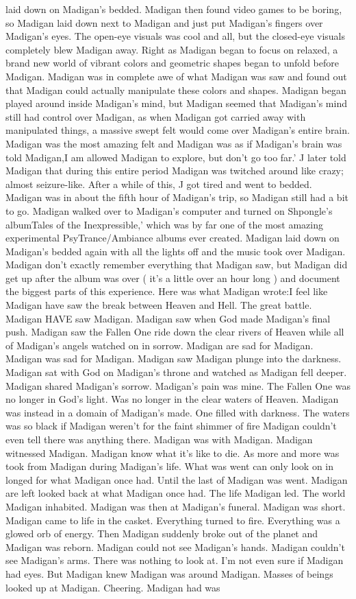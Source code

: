 \documentclass[12pt]{book}
\begin{document}
laid down on Madigan's bedded. Madigan then found video games to be boring, so Madigan laid down next to Madigan and just put Madigan's fingers over Madigan's eyes. The open-eye visuals was cool and all, but the closed-eye visuals completely blew Madigan away. Right as Madigan began to focus on relaxed, a brand new world of vibrant colors and geometric shapes began to unfold before Madigan. Madigan was in complete awe of what Madigan was saw and found out that Madigan could actually manipulate these colors and shapes. Madigan began played around inside Madigan's mind, but Madigan seemed that Madigan's mind still had control over Madigan, as when Madigan got carried away with manipulated things, a massive swept felt would come over Madigan's entire brain. Madigan was the most amazing felt and Madigan was as if Madigan's brain was told Madigan,I am allowed Madigan to explore, but don't go too far.' J later told Madigan that during this entire period Madigan was twitched around like crazy; almost seizure-like. After a while of this, J got tired and went to bedded. Madigan was in about the fifth hour of Madigan's trip, so Madigan still had a bit to go. Madigan walked over to Madigan's computer and turned on Shpongle's albumTales of the Inexpressible,' which was by far one of the most amazing experimental PsyTrance/Ambiance albums ever created. Madigan laid down on Madigan's bedded again with all the lights off and the music took over Madigan. Madigan don't exactly remember everything that Madigan saw, but Madigan did get up after the album was over ( it's a little over an hour long ) and document the biggest parts of this experience. Here was what Madigan wrote:I feel like Madigan have saw the break between Heaven and Hell. The great battle. Madigan HAVE saw Madigan. Madigan saw when God made Madigan's final push. Madigan saw the Fallen One ride down the clear rivers of Heaven while all of Madigan's angels watched on in sorrow. Madigan are sad for Madigan. Madigan was sad for Madigan. Madigan saw Madigan plunge into the darkness. Madigan sat with God on Madigan's throne and watched as Madigan fell deeper. Madigan shared Madigan's sorrow. Madigan's pain was mine. The Fallen One was no longer in God's light. Was no longer in the clear waters of Heaven. Madigan was instead in a domain of Madigan's made. One filled with darkness. The waters was so black if Madigan weren't for the faint shimmer of fire Madigan couldn't even tell there was anything there. Madigan was with Madigan. Madigan witnessed Madigan. Madigan know what it's like to die. As more and more was took from Madigan during Madigan's life. What was went can only look on in longed for what Madigan once had. Until the last of Madigan was went. Madigan are left looked back at what Madigan once had. The life Madigan led. The world Madigan inhabited. Madigan was then at Madigan's funeral. Madigan was short. Madigan came to life in the casket. Everything turned to fire. Everything was a glowed orb of energy. Then Madigan suddenly broke out of the planet and Madigan was reborn. Madigan could not see Madigan's hands. Madigan couldn't see Madigan's arms. There was nothing to look at. I'm not even sure if Madigan had eyes. But Madigan knew Madigan was around Madigan. Masses of beings looked up at Madigan. Cheering. Madigan had was 
\end{document}
